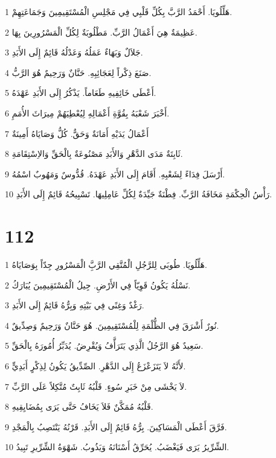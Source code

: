 \par 1 هَلِّلُويَا. أَحْمَدُ الرَّبَّ بِكُلِّ قَلْبِي فِي مَجْلِسِ الْمُسْتَقِيمِينَ وَجَمَاعَتِهِمْ.
\par 2 عَظِيمَةٌ هِيَ أَعْمَالُ الرَّبِّ. مَطْلُوبَةٌ لِكُلِّ الْمَسْرُورِينَ بِهَا.
\par 3 جَلاَلٌ وَبَهَاءٌ عَمَلُهُ وَعَدْلُهُ قَائِمٌ إِلَى الأَبَدِ.
\par 4 صَنَعَ ذِكْراً لِعَجَائِبِهِ. حَنَّانٌ وَرَحِيمٌ هُوَ الرَّبُّ.
\par 5 أَعْطَى خَائِفِيهِ طَعَاماً. يَذْكُرُ إِلَى الأَبَدِ عَهْدَهُ.
\par 6 أَخْبَرَ شَعْبَهُ بِقُوَّةِ أَعْمَالِهِ لِيُعْطِيَهُمْ مِيرَاثَ الأُمَمِ.
\par 7 أَعْمَالُ يَدَيْهِ أَمَانَةٌ وَحَقٌّ. كُلُّ وَصَايَاهُ أَمِينَةٌ
\par 8 ثَابِتَةٌ مَدَى الدَّهْرِ وَالأَبَدِ مَصْنُوعَةٌ بِالْحَقِّ وَالاِسْتِقَامَةِ.
\par 9 أَرْسَلَ فِدَاءً لِشَعْبِهِ. أَقَامَ إِلَى الأَبَدِ عَهْدَهُ. قُدُّوسٌ وَمَهُوبٌ اسْمُهُ.
\par 10 رَأْسُ الْحِكْمَةِ مَخَافَةُ الرَّبِّ. فِطْنَةٌ جَيِّدَةٌ لِكُلِّ عَامِلِيهَا. تَسْبِيحُهُ قَائِمٌ إِلَى الأَبَدِ.

\chapter{112}

\par 1 هَلِّلُويَا. طُوبَى لِلرَّجُلِ الْمُتَّقِي الرَّبَِّ الْمَسْرُورِ جِدّاً بِوَصَايَاهُ.
\par 2 نَسْلُهُ يَكُونُ قَوِيّاً فِي الأَرْضِ. جِيلُ الْمُسْتَقِيمِينَ يُبَارَكُ.
\par 3 رَغْدٌ وَغِنًى فِي بَيْتِهِ وَبِرُّهُ قَائِمٌ إِلَى الأَبَدِ.
\par 4 نُورٌ أَشْرَقَ فِي الظُّلْمَةِ لِلْمُسْتَقِيمِينَ. هُوَ حَنَّانٌ وَرَحِيمٌ وَصِدِّيقٌ.
\par 5 سَعِيدٌ هُوَ الرَّجُلُ الَّذِي يَتَرَأَّفُ وَيُقْرِضُ. يُدَبِّرُ أُمُورَهُ بِالْحَقِّ.
\par 6 لأَنَّهُ لاَ يَتَزَعْزَعُ إِلَى الدَّهْرِ. الصِّدِّيقُ يَكُونُ لِذِكْرٍ أَبَدِيٍّ.
\par 7 لاَ يَخْشَى مِنْ خَبَرِ سُوءٍ. قَلْبُهُ ثَابِتٌ مُتَّكِلاً عَلَى الرَّبِّ.
\par 8 قَلْبُهُ مُمَكَّنٌ فَلاَ يَخَافُ حَتَّى يَرَى بِمُضَايِقِيهِ.
\par 9 فَرَّقَ أَعْطَى الْمَسَاكِينَ. بِرُّهُ قَائِمٌ إِلَى الأَبَدِ. قَرْنُهُ يَنْتَصِبُ بِالْمَجْدِ.
\par 10 الشِّرِّيرُ يَرَى فَيَغْضَبُ. يُحَرِّقُ أَسْنَانَهُ وَيَذُوبُ. شَهْوَةُ الشِّرِّيرِ تَبِيدُ.

